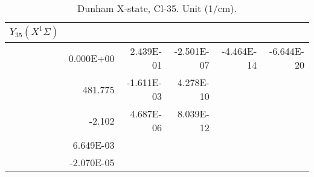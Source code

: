 \begin{table}[h]
\begin{tabular}{crrrrr}
\toprule
$Y_{35} (X^1\Sigma)$\\ \midrule 
& 0.000E+00 & 2.439E-01 & -2.501E-07 & -4.464E-14 & -6.644E-20 \\
& 481.775 & -1.611E-03 & 4.278E-10 \\
& -2.102 & 4.687E-06 & 8.039E-12 \\
& 6.649E-03 \\
& -2.070E-05 \\
\bottomrule
\end{tabular}\caption{Dunham X-state, Cl-35. Unit (1/cm).}\end{table}
